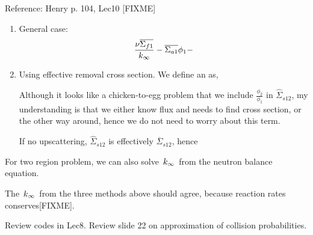 \documentclass{school-22.211-notes}
\date{March  7, 2012}
\begin{document}
\maketitle

Reference: Henry p. 104, Lec10 [FIXME] 





\begin{enumerate}
\item General case: 
  \begin{align}
    \frac{\nu \overline{\Sigma_{f1}}}{\left. k_{\infty} \right.} - \overline{\Sigma_{a1}} \phi_1 - \\
  \end{align}

\item Using effective removal cross section. We define an  as,
  

   Although it looks like a chicken-to-egg problem that we include $\frac{\phi_2}{\phi_1}$ in $\hat{\Sigma}_{s12}$, my understanding is that we either know flux and needs to find cross section, or the other way around, hence we do not need to worry about this term. 

   If no upscattering, $\hat{\Sigma}_{s12}$ is effectively $\overline{\Sigma}_{s12}$, hence 
\end{enumerate}

For two region problem, we can also solve $\left. k_{\infty} \right.$ from the neutron balance equation. 





The $\left. k_{\infty} \right.$ from the three methods above should agree, because reaction rates conserves[FIXME].



Review codes in Lec8. Review slide 22 on approximation of collision probabilities. 
\end{document}
